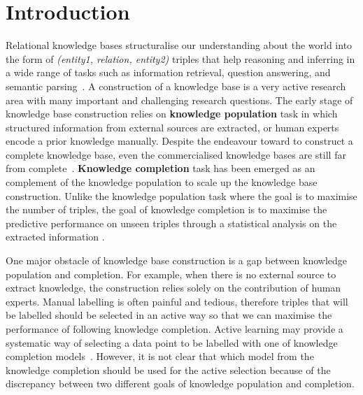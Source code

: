 
\section{Introduction}
\label{sec:intro}

Relational knowledge bases structuralise our understanding about the world into the form of \textit{(entity1, relation, entity2)} triples
that help reasoning and inferring in a wide range of tasks such as information retrieval, question answering, and semantic parsing~\cite{Dong2015,jiang2015improving,kim2013context,sondhi2014mining}.
A construction of a knowledge base is a very active research area with many important and challenging research questions.
The early stage of knowledge base construction relies on {\bf knowledge population} task
in which structured information from external sources are extracted, 
or human experts encode a prior knowledge manually.
Despite the endeavour toward to construct a complete knowledge base, 
even the commercialised knowledge bases are still far from complete~\cite{dong2014knowledge}. 
{\bf Knowledge completion} task has been emerged as an complement of the knowledge population 
to scale up the knowledge base construction. Unlike the knowledge population task where the goal is to maximise the number of triples, the goal of knowledge completion is to maximise the predictive performance on unseen triples through a statistical analysis on the extracted information \cite{guu2015traversing,Lao2010}.

One major obstacle of knowledge base construction is a gap between knowledge 
population and completion. For example, when there is no external source to extract knowledge,
the construction relies solely on the contribution of human experts.
Manual labelling is often painful and tedious, 
therefore triples that will be labelled should be selected in an active way so 
that we can maximise the performance of following knowledge completion.
Active learning may provide a systematic way of selecting a data point to be labelled with one of knowledge completion models~\cite{Settles2010}. However, it is not clear that which model from the knowledge completion should be used for the active selection because of the discrepancy between two different goals of knowledge population and completion.

